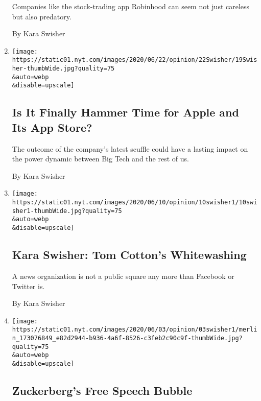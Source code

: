 \begin{enumerate}
  Companies like the stock-trading app Robinhood can seem not just
  careless but also predatory.

  By Kara Swisher
\item
  \href{/2020/06/19/opinion/apple-app-store-hey.html}{}

  \texttt{[image: https://static01.nyt.com/images/2020/06/22/opinion/22Swisher/19Swisher-thumbWide.jpg?quality=75\\\&auto=webp\\\&disable=upscale]}

  \hypertarget{is-it-finally-hammer-time-for-apple-and-its-app-store}{%
  \subsection{Is It Finally Hammer Time for Apple and Its App
  Store?}\label{is-it-finally-hammer-time-for-apple-and-its-app-store}}

  The outcome of the company's latest scuffle could have a lasting
  impact on the power dynamic between Big Tech and the rest of us.

  By Kara Swisher
\item
  \href{/2020/06/10/opinion/tom-cotton-oped-nyt.html}{}

  \texttt{[image: https://static01.nyt.com/images/2020/06/10/opinion/10swisher1/10swisher1-thumbWide.jpg?quality=75\\\&auto=webp\\\&disable=upscale]}

  \hypertarget{kara-swisher-tom-cottons-whitewashing}{%
  \subsection{Kara Swisher: Tom Cotton's
  Whitewashing}\label{kara-swisher-tom-cottons-whitewashing}}

  A news organization is not a public square any more than Facebook or
  Twitter is.

  By Kara Swisher
\item
  \href{/2020/06/03/opinion/facebook-trump-free-speech.html}{}

  \texttt{[image: https://static01.nyt.com/images/2020/06/03/opinion/03swisher1/merlin\_173076849\_e82d2944-b936-4a6f-8526-c3feb2c90c9f-thumbWide.jpg?quality=75\\\&auto=webp\\\&disable=upscale]}

  \hypertarget{zuckerbergs-free-speech-bubble}{%
  \subsection{Zuckerberg's Free Speech
  Bubble}\label{zuckerbergs-free-speech-bubble}}


\end{enumerate}
